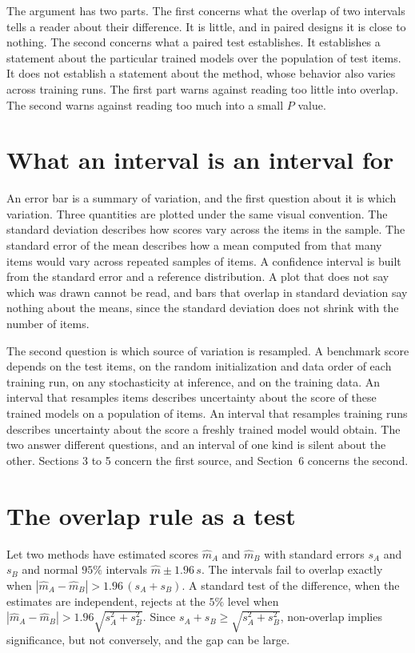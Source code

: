 \documentclass[11pt]{article}
\theoremstyle{definition}
\begin{document}
The argument has two parts. The first concerns what the overlap of two intervals tells a reader about their difference. It is little, and in paired designs it is close to nothing. The second concerns what a paired test establishes. It establishes a statement about the particular trained models over the population of test items. It does not establish a statement about the method, whose behavior also varies across training runs. The first part warns against reading too little into overlap. The second warns against reading too much into a small $P$ value.

\section{What an interval is an interval for}

An error bar is a summary of variation, and the first question about it is which variation. Three quantities are plotted under the same visual convention. The standard deviation describes how scores vary across the items in the sample. The standard error of the mean describes how a mean computed from that many items would vary across repeated samples of items. A confidence interval is built from the standard error and a reference distribution. A plot that does not say which was drawn cannot be read, and bars that overlap in standard deviation say nothing about the means, since the standard deviation does not shrink with the number of items.

The second question is which source of variation is resampled. A benchmark score depends on the test items, on the random initialization and data order of each training run, on any stochasticity at inference, and on the training data. An interval that resamples items describes uncertainty about the score of these trained models on a population of items. An interval that resamples training runs describes uncertainty about the score a freshly trained model would obtain. The two answer different questions, and an interval of one kind is silent about the other. Sections 3 to 5 concern the first source, and Section~6 concerns the second.

\section{The overlap rule as a test}

Let two methods have estimated scores $\hat m_A$ and $\hat m_B$ with standard errors $s_A$ and $s_B$ and normal $95\%$ intervals $\hat m\pm1.96\,s$. The intervals fail to overlap exactly when $|\hat m_A-\hat m_B|>1.96\,(s_A+s_B)$. A standard test of the difference, when the estimates are independent, rejects at the $5\%$ level when $|\hat m_A-\hat m_B|>1.96\sqrt{s_A^2+s_B^2}$. Since $s_A+s_B\ge\sqrt{s_A^2+s_B^2}$, non-overlap implies significance, but not conversely, and the gap can be large.
\end{document}
